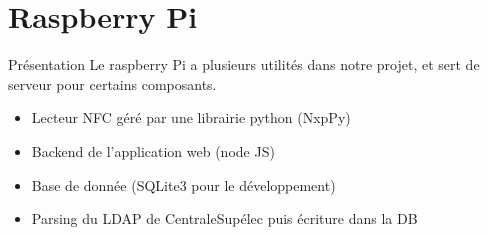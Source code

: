 \documentclass[aspectratio=169]{beamer}
\begin{document}
\section{Raspberry Pi}

\begin{frame}{Présentation}
    Le raspberry Pi a plusieurs utilités dans notre projet, et sert de serveur pour certains composants.
    \begin{itemize}
        \item Lecteur NFC géré par une librairie python (NxpPy)
        \item Backend de l'application web (node JS)
        \item Base de donnée (SQLite3 pour le développement)
        \item Parsing du LDAP de CentraleSupélec puis écriture dans la DB
    \end{itemize}


\end{frame}
\end{document}

